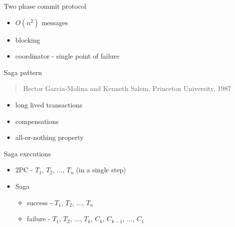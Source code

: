 \documentclass{beamer}
\begin{document}
\begin{frame}{Two phase commit protocol}

\hfill \break
\hfill \break
\hfill \break
\hfill \break
\hfill \break
\Large
\begin{itemize}
    \item $O(n^2)$ messages
    \item blocking
    \item coordinator - single point of failure
\end{itemize}
%

\end{frame}

\begin{frame}{Saga pattern}

\begin{quotation}
\begin{center}
    Hector Garcia-Molina and Kenneth Salem, Princeton University, 1987
\end{center}
\end{quotation}

\Large
\begin{itemize}
    \item long lived transactions
    \item compensations
    \item all-or-nothing property
\end{itemize}

\end{frame}


\begin{frame}{Saga executions}

\Large
\begin{itemize}
    \item 2PC - $T_1$, $T_2$, ..., $T_n$ (in a single step)
    \item Saga
    \begin{itemize}
        \Large
        \item success - $T_1$, $T_2$, ..., $T_n$
        \item failure - $T_1$, $T_2$, ..., $T_k$, $C_k$, $C_{k-1}$, ..., $C_1$
    \end{itemize}
\end{itemize}

\end{frame}
\end{document}
